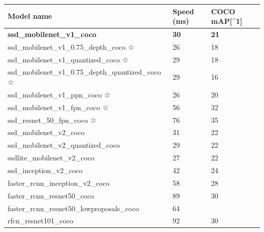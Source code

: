 \begin{table}[h!]
\begin{tabular}{lll}
Model name                                                      & Speed (ms)  & COCO mAP{[}\textasciicircum{}1{]} \\ \hline
\textbf{ssd\_mobilenet\_v1\_coco}                               & \textbf{30} & \textbf{21}                       \\
ssd\_mobilenet\_v1\_0.75\_depth\_coco ☆                         & 26          & 18                                \\
ssd\_mobilenet\_v1\_quantized\_coco ☆                           & 29          & 18                                \\
ssd\_mobilenet\_v1\_0.75\_depth\_quantized\_coco ☆              & 29          & 16                                \\
ssd\_mobilenet\_v1\_ppn\_coco ☆                                 & 26          & 20                                \\
ssd\_mobilenet\_v1\_fpn\_coco ☆                                 & 56          & 32                                \\
ssd\_resnet\_50\_fpn\_coco ☆                                    & 76          & 35                                \\
ssd\_mobilenet\_v2\_coco                                        & 31          & 22                                \\
ssd\_mobilenet\_v2\_quantized\_coco                             & 29          & 22                                \\
ssdlite\_mobilenet\_v2\_coco                                    & 27          & 22                                \\
ssd\_inception\_v2\_coco                                        & 42          & 24                                \\
faster\_rcnn\_inception\_v2\_coco                               & 58          & 28                                \\
faster\_rcnn\_resnet50\_coco                                    & 89          & 30                                \\
faster\_rcnn\_resnet50\_lowproposals\_coco                      & 64          &                                   \\
rfcn\_resnet101\_coco                                           & 92          & 30                                \\

\end{tabular}
\end{table}
